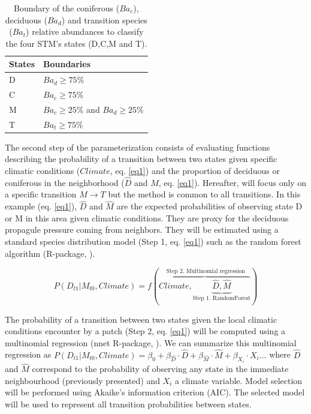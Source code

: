 \begin{table}[h]
\vspace{-1em}
\centering
\caption{Boundary of the coniferous ($Ba_c$), deciduous ($Ba_d$) and transition species ($Ba_t$) relative abundances to classify the four STM's states (D,C,M and T).}
\vspace{-1em}
\small
\begin{tabular}{|l|l|}
	\hline
	\textbf{States}  & \textbf{Boundaries}                            \\
	\hline
	D & $Ba_d \geq 75\%$    \\
	C & $Ba_c \geq 75\%$   \\
	M & $Ba_c \geq 25\%$ and $Ba_d \geq 25\%$ \\
	T & $Ba_t  \geq 75\%$ \\
	\hline                               
\end{tabular}

\label{bound}
\end{table}

The second step of the parameterization consists of evaluating functions
describing the probability of a transition between two states given specific
climatic conditions ($Climate$, eq. \ref{eq1}) and the proportion of deciduous
or coniferous in the neighborhood ($\hat{D}$ and $\hat{M}$, eq. \ref{eq1}).
Hereafter, will focus only on a specific transition $M \rightarrow T$ but the
method is common to  all transitions. In this example (eq. \ref{eq1}),
$\hat{D}$ and $\hat{M}$ are the expected probabilities of observing state D or
M in this area given climatic conditions. They are proxy for the deciduous
propagule pressure coming from neighbors. They will be estimated using  a
standard species distribution model (Step 1, eq. \ref{eq1}) such as the random
forest algorithm (R-package, \cite{Liaw2002a}).


\begin{equation}
	P(D_{t1}|M_{t0}, Climate) = f(\overbrace{Climate, \underbrace{\hat{D}, \hat{M}}_\text{Step 1. RandomForest}}^\text{ Step 2. Multinomial regression})
\label{eq1}
\end{equation}

The probability of a transition between two states given the local climatic
conditions encounter by a patch (Step 2, eq. \ref{eq1}) will be computed using
a multinomial regression (nnet R-package, \cite{Venables2002}). We can
summarize this multinomial regression as $P(D_{t1}|M_{t0},Climate) = \beta_0 +
\beta_{\hat{D}} \cdot \hat{D} + \beta_{\hat{M}} \cdot \hat{M} + \beta_{X_i}
\cdot X_i... $ where $\hat{D}$ and $\hat{M}$ correspond to the probability of
observing any state in the immediate neighbourhood (previously presented) and
$X_i$ a climate variable. Model selection will be performed using Akaike's
information criterion (AIC). The selected model will be used to represent all
transition probabilities between states. \\


